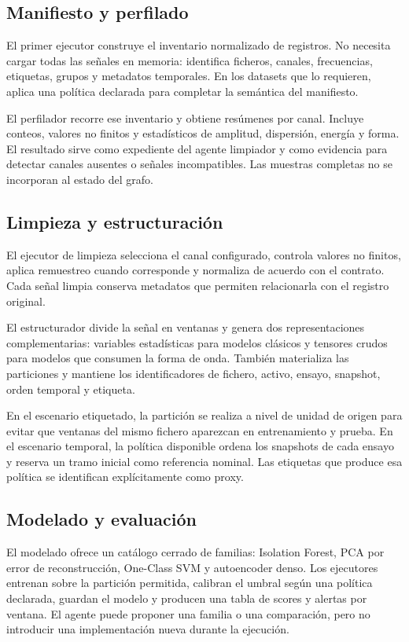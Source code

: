 \subsection{Manifiesto y perfilado}

El primer ejecutor construye el inventario normalizado de registros. No necesita
cargar todas las señales en memoria: identifica ficheros, canales, frecuencias,
etiquetas, grupos y metadatos temporales. En los datasets que lo requieren,
aplica una política declarada para completar la semántica del manifiesto.

El perfilador recorre ese inventario y obtiene resúmenes por canal. Incluye
conteos, valores no finitos y estadísticos de amplitud, dispersión, energía y
forma. El resultado sirve como expediente del agente limpiador y como evidencia
para detectar canales ausentes o señales incompatibles. Las muestras completas
no se incorporan al estado del grafo.

\subsection{Limpieza y estructuración}

El ejecutor de limpieza selecciona el canal configurado, controla valores no
finitos, aplica remuestreo cuando corresponde y normaliza de acuerdo con el
contrato. Cada señal limpia conserva metadatos que permiten relacionarla con el
registro original.

El estructurador divide la señal en ventanas y genera dos representaciones
complementarias: variables estadísticas para modelos clásicos y tensores crudos
para modelos que consumen la forma de onda. También materializa las particiones
y mantiene los identificadores de fichero, activo, ensayo, snapshot, orden
temporal y etiqueta.

En el escenario etiquetado, la partición se realiza a nivel de unidad de origen
para evitar que ventanas del mismo fichero aparezcan en entrenamiento y prueba.
En el escenario temporal, la política disponible ordena los snapshots de cada
ensayo y reserva un tramo inicial como referencia nominal. Las etiquetas que
produce esa política se identifican explícitamente como proxy.

\subsection{Modelado y evaluación}

El modelado ofrece un catálogo cerrado de familias: Isolation Forest, PCA por
error de reconstrucción, One-Class SVM y autoencoder denso. Los ejecutores
entrenan sobre la partición permitida, calibran el umbral según una política
declarada, guardan el modelo y producen una tabla de scores y alertas por
ventana. El agente puede proponer una familia o una comparación, pero no
introducir una implementación nueva durante la ejecución.

